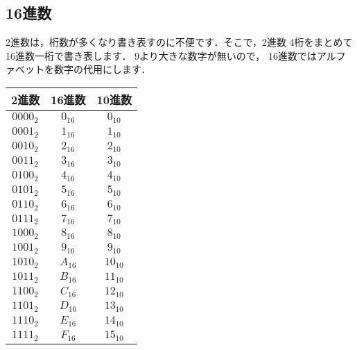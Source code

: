 \begin{center}
\end{center}

\subsection{16進数}

2進数は，桁数が多くなり書き表すのに不便です．そこで，2進数
4桁をまとめて16進数一桁で書き表します．
9より大きな数字が無いので，
16進数ではアルファベットを数字の代用にします．

\begin{center}{\small
\begin{tabular}{| c | c | c | }
\hline
{\bf 2進数} & {\bf 16進数} & {\bf 10進数} \\
\hline
$0000_2$ & $0_{16}$ & $0_{10}$ \\
$0001_2$ & $1_{16}$ & $1_{10}$ \\
$0010_2$ & $2_{16}$ & $2_{10}$ \\
$0011_2$ & $3_{16}$ & $3_{10}$ \\
$0100_2$ & $4_{16}$ & $4_{10}$ \\
$0101_2$ & $5_{16}$ & $5_{10}$ \\
$0110_2$ & $6_{16}$ & $6_{10}$ \\
$0111_2$ & $7_{16}$ & $7_{10}$ \\
$1000_2$ & $8_{16}$ & $8_{10}$ \\
$1001_2$ & $9_{16}$ & $9_{10}$ \\
$1010_2$ & $A_{16}$ & $10_{10}$ \\
$1011_2$ & $B_{16}$ & $11_{10}$ \\
$1100_2$ & $C_{16}$ & $12_{10}$ \\
$1101_2$ & $D_{16}$ & $13_{10}$ \\
$1110_2$ & $E_{16}$ & $14_{10}$ \\
$1111_2$ & $F_{16}$ & $15_{10}$ \\
\hline
\end{tabular}}
\end{center}

